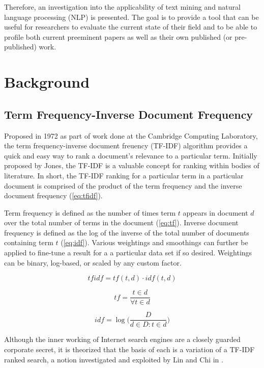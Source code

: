 \documentclass[conference]{IEEEtran}
\begin{document}
Therefore, an investigation into the applicability of text mining and natural language processing (NLP) is presented. The goal is to provide a tool that can be useful for researchers to evaluate the current state of their field and to be able to profile both current preeminent papers as well as their own published (or pre-published) work.

\section{Background}

\subsection{Term Frequency-Inverse Document Frequency}

Proposed in 1972 as part of work done at the Cambridge Computing Laboratory, the term frequency-inverse document freuency (TF-IDF) algorithm \cite{sparck1972statistical} provides a quick and easy way to rank a document's relevance to a particular term. Initially proposed by Jones, the TF-IDF is a valuable concept for ranking within bodies of literature. In short, the TF-IDF ranking for a particular term in a particular document is comprised of the product of the term frequency and the inverse document frequency (\ref{eq:tfidf}).

Term frequency is defined as the number of times term $t$ appears in document $d$ over the total number of terms in the document (\ref{eq:tf}). Inverse document frequency is defined as the log of the inverse of the total number of documents containing term $t$ (\ref{eq:idf}).  Various weightings and smoothings can further be applied to fine-tune a result for a a particular data set if so desired. Weightings can be binary, log-based, or scaled by any custom factor.

\begin{equation}
\label{eq:tfidf}
tfidf = tf(t,d) \cdot idf(t,d)
\end{equation}

\begin{equation}
\label{eq:tf}
tf = \frac{t \in d}{\forall t \in d}
\end{equation}

\begin{equation}
\label{eq:idf}
idf = \log \Big( \frac{D}{d \in D : t \in d} \Big)
\end{equation}

Although the inner working of Internet search engines are a closely guarded corporate secret, it is theorized that the basis of each is a variation of a TF-IDF ranked search, a notion investigated and exploited by Lin and Chi in \cite{6845978}.
\end{document}
